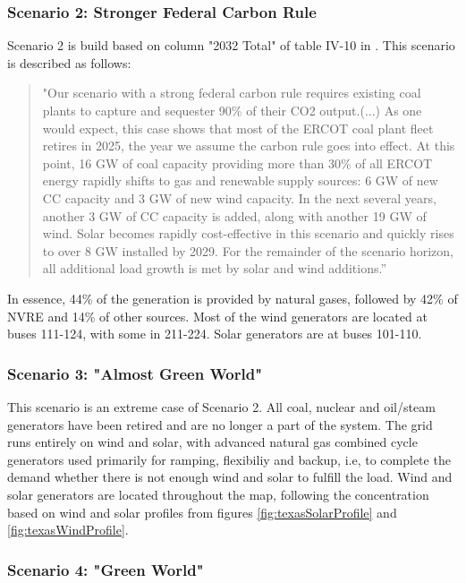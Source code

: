 \documentclass[12pt,LUDisStyle,twosided]{book}
\begin{document}
\subsubsection{Scenario 2: Stronger Federal Carbon Rule}

Scenario 2 is build based on column "2032 Total" of table IV-10 in \cite{shavel}. This scenario is described as follows:

\begin{quotation}
"Our scenario with a strong federal carbon rule requires existing coal plants to capture and sequester 90\% of their CO2 output.(...)
As one would expect, this case shows that most of the ERCOT coal plant fleet retires in 2025, the year we assume the carbon rule goes into effect. At this point, 16 GW of coal capacity providing more than 30\% of all ERCOT energy rapidly shifts to gas and renewable supply sources: 6 GW of new CC capacity and 3 GW of new wind capacity. In the next several years, another 3 GW of CC capacity is added, along with another 19 GW of wind. Solar becomes rapidly cost-effective in this scenario and quickly rises to over 8 GW installed by 2029. For the remainder of the scenario horizon, all additional load growth is met by solar and wind additions.”
\end{quotation}

In essence, 44\% of the generation is provided by natural gases, followed by 42\% of NVRE and 14\% of other sources. Most of the wind generators are located at buses 111-124, with some in 211-224. Solar generators are at buses 101-110.


\subsubsection{Scenario 3: "Almost Green World"}

This scenario is an extreme case of Scenario 2. All coal, nuclear and oil/steam generators have been retired and are no longer a part of the system. The grid runs entirely on wind and solar, with advanced natural gas combined cycle generators used primarily for ramping, flexibiliy and backup, i.e, to complete the demand whether there is not enough wind and solar to fulfill the load. Wind and solar generators are located throughout the map, following the concentration based on wind and solar profiles from figures \ref{fig:texasSolarProfile} and \ref{fig:texasWindProfile}.

\subsubsection{Scenario 4: "Green World"}
\end{document}
